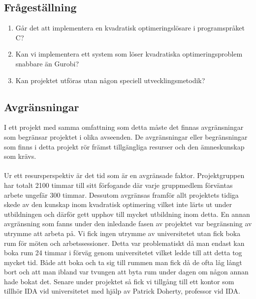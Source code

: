 \subsection{Frågeställning}
	\begin{enumerate}
		\item Går det att implementera en kvadratisk optimeringslösare i programspråket C?
		\item Kan vi implementera ett system som löser kvadratiska optimeringsproblem snabbare än Gurobi?
		\item Kan projektet utföras utan någon speciell utvecklingsmetodik? 
	\end{enumerate}

\subsection{Avgränsningar}
I ett projekt med samma omfattning som detta måste det finnas avgränsningar som begränsar projektet i olika avseenden. De avgränsningar eller begränsningar som finns i detta projekt rör främst tillgängliga resurser och den ämneskunskap som krävs.
\\ \\
Ur ett resursperspektiv är det tid som är en avgränsade faktor. Projektgruppen har totalt 2100 timmar till sitt förfogande där varje gruppmedlem förväntas arbete ungefär 300 timmar. Dessutom avgränsas framför allt projektets tidiga skede av den kunskap inom kvadratisk optimering vilket inte lärts ut under utbildningen och därför gett upphov till mycket utbildning inom detta.
\newline
\newline
En annan avgränsning som fanns under den inledande fasen av projektet var begränsning av utrymme att arbeta på. Vi fick ingen utrymme av universitetet utan fick boka rum för möten och arbetssessioner. Detta var problematiskt då man endast kan boka rum 24 timmar i förväg genom universitetet vilket ledde till att detta tog mycket tid. Både att boka och ta sig till rummen man fick då de ofta låg långt bort och att man ibland var tvungen att byta rum under dagen om någon annan hade bokat det. Senare under projektet så fick vi tillgång till ett kontor som tillhör IDA vid universitetet med hjälp av Patrick Doherty, professor vid IDA. 